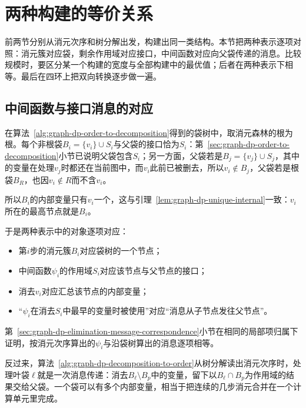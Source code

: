 
\section{两种构建的等价关系}
\label{sec:graph-dp-construction-equivalence}

前两节分别从消元次序和树分解出发，构建出同一类结构。本节把两种表示逐项对照：消元簇对应袋，剩余作用域对应接口，中间函数对应向父袋传递的消息。比较规模时，要区分某一个构建的宽度与全部构建中的最优值；后者在两种表示下相等。最后在四环上把双向转换逐步做一遍。

\subsection{中间函数与接口消息的对应}
\label{sec:graph-dp-function-message-correspondence}

在算法~\ref{alg:graph-dp-order-to-decomposition}得到的袋树中，取消元森林的根为根。每个非根袋$B_i=\{v_i\}\cup S_i$与父袋的接口恰为$S_i$：第~\ref{sec:graph-dp-order-to-decomposition}小节已说明父袋包含$S_i$；另一方面，父袋若是$B_j=\{v_j\}\cup S_j$，其中的变量在处理$v_j$时都还在当前图中，而$v_i$此前已被删去，所以$v_i\notin B_j$，父袋若是根袋$B_R$，也因$v_i\notin R$而不含$v_i$。

所以$B_i$的内部变量只有$v_i$一个，这与引理~\ref{lem:graph-dp-unique-internal}一致：$v_i$所在的最高节点就是$B_i$。

于是两种表示中的对象逐项对应：
\begin{itemize}
  \item 第$i$步的消元簇$B_i$对应袋树的一个节点；
  \item 中间函数$\psi_i$的作用域$S_i$对应该节点与父节点的接口；
  \item 消去$v_i$对应汇总该节点的内部变量；
  \item “$\psi_i$在消去$S_i$中最早的变量时被使用”对应“消息从子节点发往父节点”。
\end{itemize}
第~\ref{sec:graph-dp-elimination-message-correspondence}小节在相同的局部项归属下证明，按消元次序算出的$\psi_i$与沿袋树算出的消息逐项相等。

反过来，算法~\ref{alg:graph-dp-decomposition-to-order}从树分解读出消元次序时，处理叶袋$\ell$就是一次消息传递：消去$B_\ell\setminus B_p$中的变量，留下以$B_\ell\cap B_p$为作用域的结果交给父袋。一个袋可以有多个内部变量，相当于把连续的几步消元合并在一个计算单元里完成。

